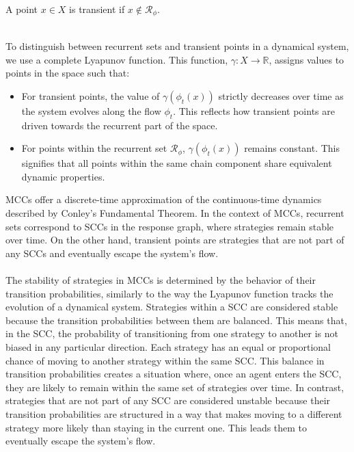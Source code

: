 \begin{flushleft}
\begin{flushleft}
\begin{flushleft}
            \begin{definition}
                A point $x \in X$ is transient if $x \notin \mathcal{R}_\phi$.\\~\\
            \end{definition}

        \end{flushleft}

        To distinguish between recurrent sets and transient points in a dynamical system, we use a complete Lyapunov function. This function, $\gamma: X \to \mathbb{R}$, assigns values to points in the space such that:
        \begin{itemize}
            \item For transient points, the value of $\gamma(\phi_t(x))$ strictly decreases over time as the system evolves along the flow $\phi_t$. This reflects how transient points are driven towards the recurrent part of the space.
            \item For points within the recurrent set $\mathcal{R}_\phi$, $\gamma(\phi_t(x))$ remains constant. This signifies that all points within the same chain component share equivalent dynamic properties.
        \end{itemize}

        MCCs offer a discrete-time approximation of the continuous-time dynamics described by Conley’s Fundamental Theorem. In the context of MCCs, recurrent sets correspond to SCCs in the response graph, where strategies remain stable over time. On the other hand, transient points are strategies that are not part of any SCCs and eventually escape the system's flow.\\~\\
        
        The stability of strategies in MCCs is determined by the behavior of their transition probabilities, similarly to the way the Lyapunov function tracks the evolution of a dynamical system. Strategies within a SCC are considered stable because the transition probabilities between them are balanced. This means that, in the SCC, the probability of transitioning from one strategy to another is not biased in any particular direction. Each strategy has an equal or proportional chance of moving to another strategy within the same SCC. This balance in transition probabilities creates a situation where, once an agent enters the SCC, they are likely to remain within the same set of strategies over time. In contrast, strategies that are not part of any SCC are considered unstable because their transition probabilities are structured in a way that makes moving to a different strategy more likely than staying in the current one. This leads them to eventually escape the system's flow.


\end{flushleft}
\end{flushleft}
